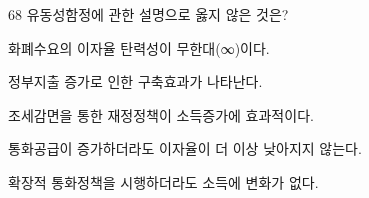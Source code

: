 \begin{question}{68}
유동성함정에 관한 설명으로 옳지 않은 것은?
\begin{choices}
  \item 화폐수요의 이자율 탄력성이 무한대(∞)이다.
  \item 정부지출 증가로 인한 구축효과가 나타난다.
  \item 조세감면을 통한 재정정책이 소득증가에 효과적이다.
  \item 통화공급이 증가하더라도 이자율이 더 이상 낮아지지 않는다.
  \item 확장적 통화정책을 시행하더라도 소득에 변화가 없다.
\end{choices}
\end{question}
